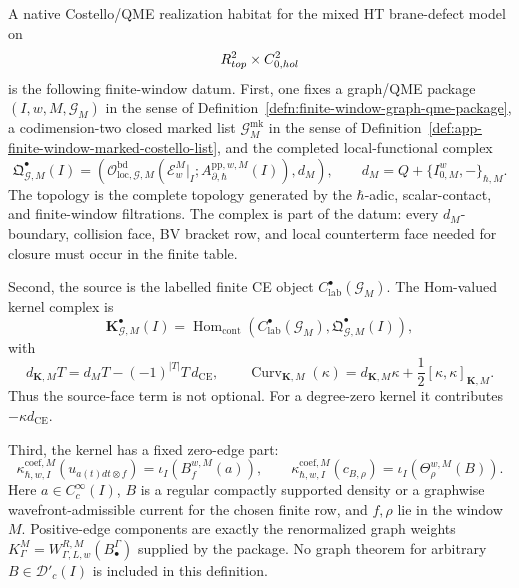 \begin{defn}
\label{def:app-native-finite-window-realization-habitat}
  A native Costello/QME realization habitat for the mixed HT brane-defect
  model on
  \[
    R^2_{top}\times C^2_{0,hol}
  \]
  is the following finite-window datum.  First, one fixes a graph/QME
  package \((I,w,M,\mathcal G_M)\) in the sense of
  Definition~\ref{defn:finite-window-graph-qme-package}, a
  codimension-two closed marked list
  \(\mathcal G^{\mathrm{mk}}_M\) in the sense of
  Definition~\ref{def:app-finite-window-marked-costello-list}, and the
  completed local-functional complex
  \[
    \mathfrak Q^\bullet_{\mathcal G,M}(I)
      =
    \left(
      \mathcal O^{\mathrm{bd}}_{\mathrm{loc},\mathcal G,M}
      (\mathcal E_w^M|_I;
       A^{\mathrm{pp},w,M}_{\partial,\hbar}(I)),
      d_M
    \right),
    \qquad
    d_M=Q+\{I^w_{0,M},-\}_{\hbar,M}.
  \]
  The topology is the complete topology generated by the \(\hbar\)-adic,
  scalar-contact, and finite-window filtrations.  The complex is part of
  the datum: every \(d_M\)-boundary, collision face, BV bracket row, and
  local counterterm face needed for closure must occur in the finite
  table.

  Second, the source is the labelled finite CE object
  \(C^\bullet_{\mathrm{lab}}(\mathcal G_M)\).  The Hom-valued kernel
  complex is
  \[
    \mathbf K^\bullet_{\mathcal G,M}(I)
      =
    \operatorname{Hom}_{\mathrm{cont}}
    \left(
      C^\bullet_{\mathrm{lab}}(\mathcal G_M),
      \mathfrak Q^\bullet_{\mathcal G,M}(I)
    \right),
  \]
  with
  \[
    d_{\mathbf K,M}T
      =
    d_M T-(-1)^{|T|}T\,d_{\mathrm{CE}},
    \qquad
    \operatorname{Curv}_{\mathbf K,M}(\kappa)
      =
    d_{\mathbf K,M}\kappa+\frac12[\kappa,\kappa]_{\mathbf K,M}.
  \]
  Thus the source-face term is not optional.  For a degree-zero kernel it
  contributes \(-\kappa d_{\mathrm{CE}}\).

  Third, the kernel has a fixed zero-edge part:
  \[
    \kappa^{\mathrm{coef},M}_{\hbar,w,I}(u_{a(t)dt\otimes f})
      =
    \iota_I(B^{w,M}_f(a)),
    \qquad
    \kappa^{\mathrm{coef},M}_{\hbar,w,I}(c_{B,\rho})
      =
    \iota_I(\Theta^{w,M}_\rho(B)).
  \]
  Here \(a\in C^\infty_c(I)\), \(B\) is a regular compactly supported
  density or a graphwise wavefront-admissible current for the chosen
  finite row, and \(f,\rho\) lie in the window \(M\).  Positive-edge
  components are exactly the renormalized graph weights
  \(K^M_\Gamma=W^{R,M}_{\Gamma,L,w}(B^\Gamma_\bullet)\) supplied by the
  package.  No graph theorem for arbitrary \(B\in\mathcal D'_c(I)\) is
  included in this definition.


\end{defn}
